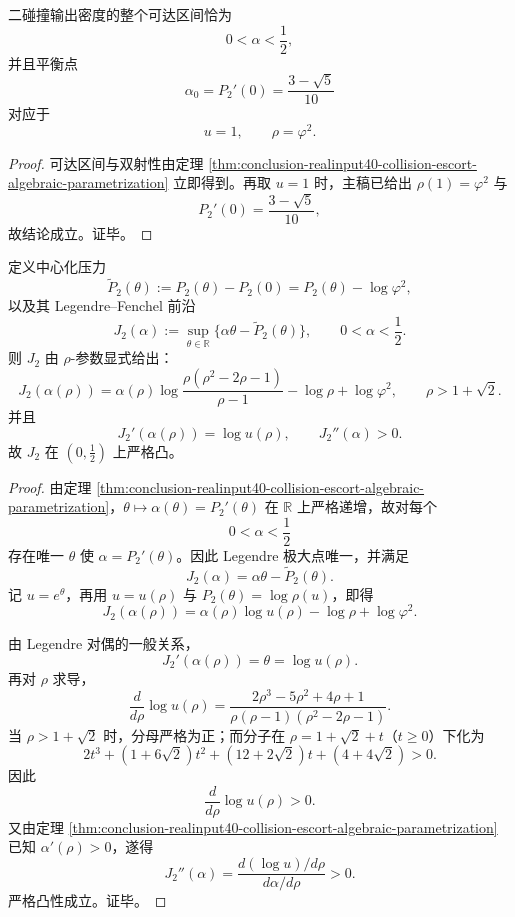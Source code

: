 \begin{corollary}\label{cor:conclusion-realinput40-collision-density-range-balanced-anchor}
二碰撞输出密度的整个可达区间恰为
\[
0<\alpha<\frac12,
\]
并且平衡点
\[
\alpha_0=P_2'(0)=\frac{3-\sqrt5}{10}
\]
对应于
\[
u=1,
\qquad
\rho=\varphi^2.
\]
\end{corollary}
\begin{proof}
可达区间与双射性由定理 \ref{thm:conclusion-realinput40-collision-escort-algebraic-parametrization} 立即得到。再取 \(u=1\) 时，主稿已给出 \(\rho(1)=\varphi^2\) 与
\[
P_2'(0)=\frac{3-\sqrt5}{10},
\]
故结论成立。证毕。
\end{proof}

\begin{theorem}\label{thm:conclusion-realinput40-centered-cramer-explicit-algebraic-frontier}
定义中心化压力
\[
\widetilde P_2(\theta):=P_2(\theta)-P_2(0)=P_2(\theta)-\log \varphi^2,
\]
以及其 Legendre--Fenchel 前沿
\[
J_2(\alpha):=\sup_{\theta\in\mathbb R}\{\alpha\theta-\widetilde P_2(\theta)\},
\qquad
0<\alpha<\frac12.
\]
则 \(J_2\) 由 \(\rho\)-参数显式给出：
\[
J_2(\alpha(\rho))
=
\alpha(\rho)\log\!\frac{\rho(\rho^2-2\rho-1)}{\rho-1}
-\log\rho+\log\varphi^2,
\qquad
\rho>1+\sqrt2.
\]
并且
\[
J_2'(\alpha(\rho))=\log u(\rho),
\qquad
J_2''(\alpha)>0.
\]
故 \(J_2\) 在 \((0,\frac12)\) 上严格凸。
\end{theorem}
\begin{proof}
由定理 \ref{thm:conclusion-realinput40-collision-escort-algebraic-parametrization}，\(\theta\mapsto \alpha(\theta)=P_2'(\theta)\) 在 \(\mathbb R\) 上严格递增，故对每个
\[
0<\alpha<\frac12
\]
存在唯一 \(\theta\) 使 \(\alpha=P_2'(\theta)\)。因此 Legendre 极大点唯一，并满足
\[
J_2(\alpha)=\alpha\theta-\widetilde P_2(\theta).
\]
记 \(u=e^\theta\)，再用 \(u=u(\rho)\) 与 \(P_2(\theta)=\log\rho(u)\)，即得
\[
J_2(\alpha(\rho))
=
\alpha(\rho)\log u(\rho)-\log\rho+\log\varphi^2.
\]

由 Legendre 对偶的一般关系，
\[
J_2'(\alpha(\rho))=\theta=\log u(\rho).
\]
再对 \(\rho\) 求导，
\[
\frac{d}{d\rho}\log u(\rho)
=
\frac{2\rho^3-5\rho^2+4\rho+1}{\rho(\rho-1)(\rho^2-2\rho-1)}.
\]
当 \(\rho>1+\sqrt2\) 时，分母严格为正；而分子在 \(\rho=1+\sqrt2+t\)（\(t\ge 0\)）下化为
\[
2t^3+(1+6\sqrt2)t^2+(12+2\sqrt2)t+(4+4\sqrt2)>0.
\]
因此
\[
\frac{d}{d\rho}\log u(\rho)>0.
\]
又由定理 \ref{thm:conclusion-realinput40-collision-escort-algebraic-parametrization} 已知 \(\alpha'(\rho)>0\)，遂得
\[
J_2''(\alpha)
=
\frac{d(\log u)/d\rho}{d\alpha/d\rho}>0.
\]
严格凸性成立。证毕。
\end{proof}

